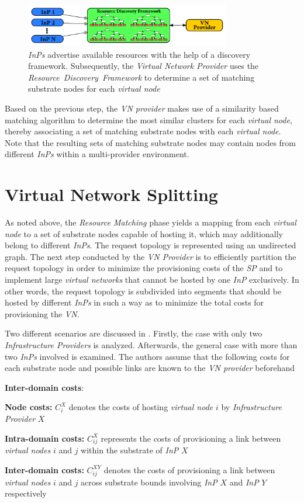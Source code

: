 \documentclass[prodmode,acmtomccap]{acmlarge}
\begin{document}
\begin{figure}[htb]
	\centering
	\includegraphics[width=0.8\textwidth]{rdf}
	\caption{\emph{InPs} advertise available resources with the help of a discovery framework. 
		Subsequently,  the \emph{Virtual Network Provider} uses the \emph{Resource~Discovery~Framework} to determine a set of matching substrate nodes for each \emph{virtual node}}
	\label{fig4}
\end{figure}

Based on the previous step, the \emph{VN provider} makes use of a similarity based matching algorithm to determine the most similar clusters for each \emph{virtual node}, thereby associating a set of matching substrate
nodes with each \emph{virtual node}. Note that the resulting sets of matching substrate nodes may contain nodes from different \emph{InPs} within a multi-provider environment.

\section{Virtual Network Splitting}
\label{sec:splitting}
As noted above, the \emph{Resource Matching} phase yields a mapping from each \emph{virtual node} to a set of substrate nodes capable of hosting it, which may additionally belong to different \emph{InPs}.
The request topology is represented using an undirected graph. 
The next step conducted by the \emph{VN Provider} is to efficiently partition the request topology in order to minimize the provisioning costs of the \emph{SP} and to implement large \emph{virtual networks}
that cannot be hosted by one \emph{InP} exclusively. In other words, the request topology is subdivided into segments that should be hosted by different \emph{InPs} in such a way as to
minimize the total costs for provisioning the \emph{VN}.

Two different scenarios are discussed in . Firstly, the case with only two \emph{Infrastructure Providers} is analyzed. Afterwards, the general case with more than two \emph{InPs} involved
is examined. The authors assume that the following costs for each substrate node and possible links are known to the \emph{VN provider} beforehand

\begin{describe}{{\bfseries Inter-domain costs\/}:}
	\item[\bfseries Node costs:] $C_i^X$ denotes the costs of hosting \emph{virtual node} $i$ by \emph{Infrastructure Provider} $X$ 
	\item[\bfseries Intra-domain costs:] $C_{ij}^X$ represents the costs of provisioning a link between \emph{virtual nodes} $i$ and $j$ within the substrate of \emph{InP} $X$ 
	\item[\bfseries Inter-domain costs:] $C_{ij}^{XY}$ denotes the costs of provisioning a link between \emph{virtual nodes} $i$ and $j$ across substrate bounds involving \emph{InP} $X$ and \emph{InP} $Y$ respectively	
\end{describe}
\end{document}
